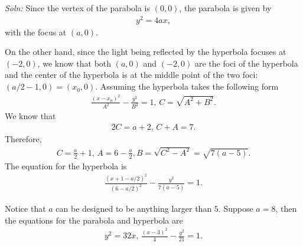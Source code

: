 \documentclass{article}
\begin{document}
\begin{enumerate}
\begin{figure}[ht]
  \end{figure}
  \emph{Soln:} Since the vertex of the parabola is $(0,0)$, the parabola is given by
  \begin{align*}
    y^2 = 4ax,
  \end{align*}
  with the focus at $(a,0)$.

  On the other hand, since the light being reflected by the hyperbola focuses at $(-2,0)$, we know that both $(a,0)$ and $(-2,0)$ are the foci of the hyperbola and the center of the hyperbola is at the middle point of the two foci: $(a/2-1,0)=(x_0,0)$. Assuming the hyperbola takes the following form
  \begin{align*}
    \frac{(x-x_0)^2}{A^2} - \frac{y^2}{B^2} = 1,\, C =\sqrt{A^2+B^2}.
  \end{align*}
  We know that
  \begin{align*}
    2C = a+2,\,C+A = 7.
  \end{align*}
  Therefore,
  \begin{align*}
    C = \frac{a}{2}+1,\,A = 6-\frac{a}{2}, B = \sqrt{C^2-A^2} = \sqrt{7(a-5)}.
  \end{align*}
  The equation for the hyperbola is
  \begin{align*}
    \frac{(x+1-a/2)^2}{(6-a/2)^2} - \frac{y^2}{7(a-5)} = 1.
  \end{align*}

  Notice that $a$ can be designed to be anything larger than $5$. Suppose $a = 8$, then the equations for the parabola and hyperbola are
\begin{align*}
  y^2 = 32x,\, \frac{(x-3)^2}{4} - \frac{y^2}{21} = 1.
\end{align*}

\end{enumerate}
\end{document}
